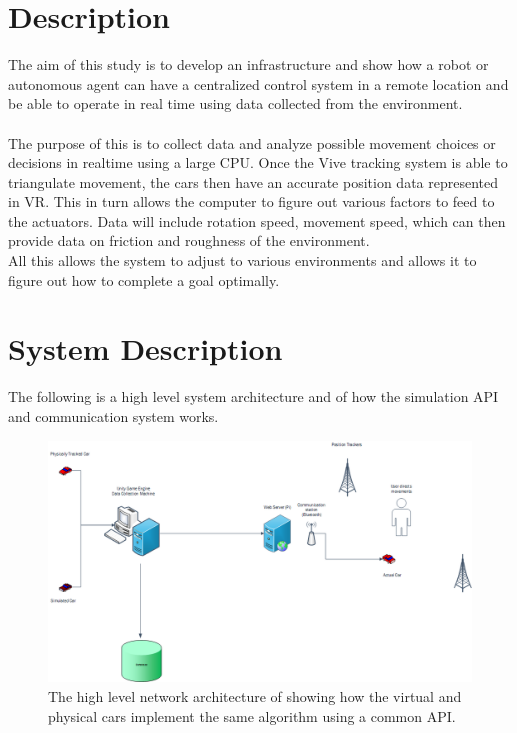 \documentclass[10pt,a4paper]{article}
\begin{document}
	\section*{Description}
	The aim of this study is to develop an infrastructure and show how a robot or autonomous agent can have a centralized control system in a remote location and be able to operate in real time using data collected from the environment.
	\\\\
	The purpose of this is to collect data and analyze possible movement choices or decisions in realtime using a large CPU. Once the Vive tracking system is able to triangulate movement, the cars then have an accurate position data represented in VR. This in turn allows the computer to figure out various factors to feed to the actuators. Data will include rotation speed, movement speed, which can then provide data on friction and roughness of the environment.
	\\
	All this allows the system to adjust to various environments and allows it to figure out how to complete a goal optimally.
	\section*{System Description}
	The following is a high level system architecture and of how the simulation API and communication system works.
	\begin{figure}[h]	\centering
		\includegraphics[width=1\textwidth]{AwesomeDrawing.png}
		\caption{The high level network architecture of showing how the virtual and physical cars implement the same algorithm using a common API.}
		\label{fig:system-architecture}
	\end{figure}
\end{document}
